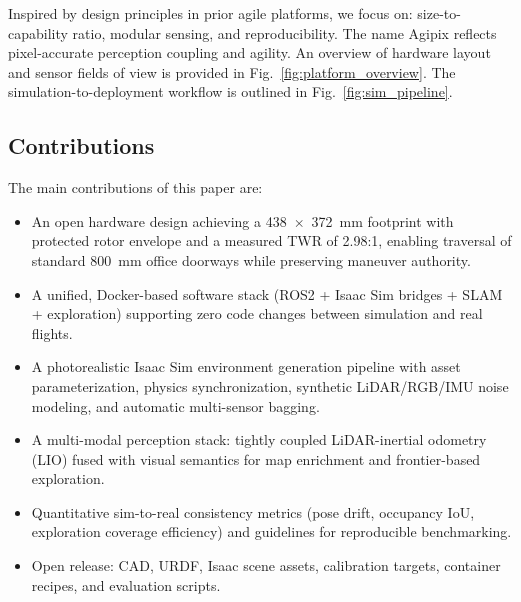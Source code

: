 \documentclass[letterpaper, 10 pt, conference]{ieeeconf}  %
\begin{document}
Inspired by design principles in prior agile platforms, we focus on: size-to-capability ratio, modular sensing, and reproducibility. The name Agipix reflects pixel-accurate perception coupling and agility. An overview of hardware layout and sensor fields of view is provided in Fig.~\ref{fig:platform_overview}. The simulation-to-deployment workflow is outlined in Fig.~\ref{fig:sim_pipeline}.

\subsection{Contributions}
The main contributions of this paper are:
\begin{itemize}
        \item An open hardware design achieving a 438~\(\times\)~372~mm footprint with protected rotor envelope and a measured TWR of 2.98:1, enabling traversal of standard 800~mm office doorways while preserving maneuver authority.
        \item A unified, Docker-based software stack (ROS2 + Isaac Sim bridges + SLAM + exploration) supporting zero code changes between simulation and real flights.
        \item A photorealistic Isaac Sim environment generation pipeline with asset parameterization, physics synchronization, synthetic LiDAR/RGB/IMU noise modeling, and automatic multi-sensor bagging.
        \item A multi-modal perception stack: tightly coupled LiDAR-inertial odometry (LIO) fused with visual semantics for map enrichment and frontier-based exploration.
        \item Quantitative sim-to-real consistency metrics (pose drift, occupancy IoU, exploration coverage efficiency) and guidelines for reproducible benchmarking.
        \item Open release: CAD, URDF, Isaac scene assets, calibration targets, container recipes, and evaluation scripts.
\end{itemize}
\end{document}

